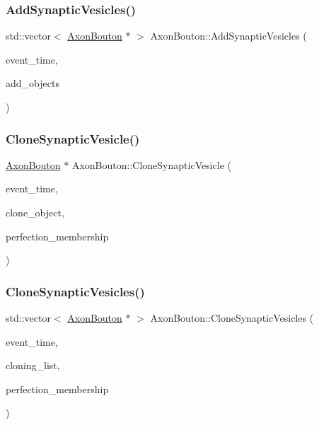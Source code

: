\subsubsection{\texorpdfstring{Add\+Synaptic\+Vesicles()}{AddSynapticVesicles()}}
{\footnotesize\ttfamily std\+::vector$<$ \mbox{\hyperlink{classAxonBouton}{Axon\+Bouton}} $\ast$ $>$ Axon\+Bouton\+::\+Add\+Synaptic\+Vesicles (\begin{DoxyParamCaption}\item[{std\+::chrono\+::time\+\_\+point$<$ \mbox{\hyperlink{universe_8h_a0ef8d951d1ca5ab3cfaf7ab4c7a6fd80}{Clock}} $>$}]{event\+\_\+time,  }\item[{std\+::vector$<$ \mbox{\hyperlink{classAxonBouton}{Axon\+Bouton}} $\ast$$>$}]{add\+\_\+objects }\end{DoxyParamCaption})}

\mbox{\label{classAxonBouton_a0e739b20447539f8db3655e83575fcf4}} 
\subsubsection{\texorpdfstring{Clone\+Synaptic\+Vesicle()}{CloneSynapticVesicle()}}
{\footnotesize\ttfamily \mbox{\hyperlink{classAxonBouton}{Axon\+Bouton}} $\ast$ Axon\+Bouton\+::\+Clone\+Synaptic\+Vesicle (\begin{DoxyParamCaption}\item[{std\+::chrono\+::time\+\_\+point$<$ \mbox{\hyperlink{universe_8h_a0ef8d951d1ca5ab3cfaf7ab4c7a6fd80}{Clock}} $>$}]{event\+\_\+time,  }\item[{\mbox{\hyperlink{classAxonBouton}{Axon\+Bouton}} $\ast$}]{clone\+\_\+object,  }\item[{double}]{perfection\+\_\+membership }\end{DoxyParamCaption})}

\mbox{\label{classAxonBouton_a7bf1d8db3287dc5357d0095233f5c47f}} 
\subsubsection{\texorpdfstring{Clone\+Synaptic\+Vesicles()}{CloneSynapticVesicles()}}
{\footnotesize\ttfamily std\+::vector$<$ \mbox{\hyperlink{classAxonBouton}{Axon\+Bouton}} $\ast$ $>$ Axon\+Bouton\+::\+Clone\+Synaptic\+Vesicles (\begin{DoxyParamCaption}\item[{std\+::chrono\+::time\+\_\+point$<$ \mbox{\hyperlink{universe_8h_a0ef8d951d1ca5ab3cfaf7ab4c7a6fd80}{Clock}} $>$}]{event\+\_\+time,  }\item[{std\+::vector$<$ \mbox{\hyperlink{classAxonBouton}{Axon\+Bouton}} $\ast$$>$}]{cloning\+\_\+list,  }\item[{double}]{perfection\+\_\+membership }\end{DoxyParamCaption})}

